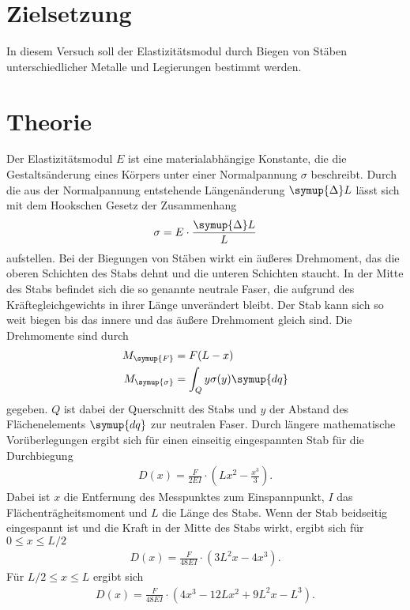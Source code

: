 \section{Zielsetzung}
\label{sec:Zielsetzung}
In diesem Versuch soll der Elastizitätsmodul durch Biegen von Stäben unterschiedlicher Metalle und Legierungen bestimmt werden.

\section{Theorie}
\label{sec:Theorie}
Der Elastizitätsmodul $E$ ist eine materialabhängige Konstante, die die Gestaltsänderung eines Körpers unter einer Normalpannung $\sigma$ beschreibt.
Durch die aus der Normalpannung entstehende Längenänderung $\symup{\Delta} L$ lässt sich mit dem Hookschen Gesetz der Zusammenhang
\begin{align}
    \label{eqn:Elasitizitaetsmodul}
    \sigma = E \cdot \frac{\symup{\Delta} L}{L}
\end{align}
aufstellen. Bei der Biegungen von Stäben wirkt ein äußeres Drehmoment, das die oberen Schichten des Stabs dehnt und die unteren Schichten staucht.
In der Mitte des Stabs befindet sich die so genannte neutrale Faser, die aufgrund des Kräftegleichgewichts in ihrer Länge unverändert bleibt.
Der Stab kann sich so weit biegen bis das innere und das äußere Drehmoment gleich sind. Die Drehmomente sind durch
\begin{align*}
    M_{\symup{F}} &= F(L-x)\\
    M_{\symup{\sigma}} &= \int_{Q} y\sigma(y)\symup{dq}
\end{align*}
gegeben. $Q$ ist dabei der Querschnitt des Stabs und $y$ der Abstand des Flächenelements $\symup{dq}$ zur neutralen Faser.
Durch längere mathematische Vorüberlegungen ergibt sich für einen einseitig eingespannten Stab für die Durchbiegung
\begin{align}
    \label{eqn:Durchbiegung}
    D(x) = \frac{F}{2EI} \cdot\left(Lx^2 - \frac{x^3}{3}\right).
\end{align}
Dabei ist $x$ die Entfernung des Messpunktes zum Einspannpunkt, $I$ das Flächenträgheitsmoment und $L$ die Länge des Stabs.
Wenn der Stab beidseitig eingespannt ist und die Kraft in der Mitte des Stabs wirkt, ergibt sich für $0 \leq x \leq L/2$
\begin{align}
    \label{eqn:DurchbiegungL/2}
    D(x) = \frac{F}{48EI}\cdot \left(3L^2 x - 4x^3\right).
\end{align}
Für $L/2 \leq x \leq L$ ergibt sich
\begin{align}
    \label{eqn:DurchbiegungL}
    D(x) = \frac{F}{48EI}\cdot \left(4x^3 -12Lx^2 +9L^2 x - L^3\right).
\end{align}
